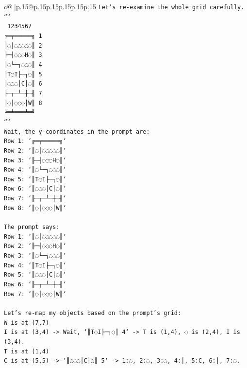 \documentclass{article}
\begin{document}
{\begin{supertabular}{c@{$\;$}|p{.15\linewidth}@{}p{.15\linewidth}p{.15\linewidth}p{.15\linewidth}p{.15\linewidth}p{.15\linewidth}}
{{{\texttt{Let's re{-}examine the whole grid carefully.} \\
\texttt{```} \\
\texttt{ 1234567} \\
\texttt{╔═╤═════╗ 1} \\
\texttt{║◌│◌◌◌◌◌║ 2} \\
\texttt{╟─┤◌◌◌H◌║ 3} \\
\texttt{║◌└─┐◌◌◌║ 4} \\
\texttt{║T◌I├─┐◌║ 5} \\
\texttt{║◌◌◌│C│◌║ 6} \\
\texttt{╟─┬─┴─┼─╢ 7} \\
\texttt{║◌│◌◌◌│W║ 8} \\
\texttt{╚═╧═══╧═╝} \\
\texttt{```} \\
\texttt{Wait, the y{-}coordinates in the prompt are:} \\
\texttt{Row 1: `╔═╤═════╗`} \\
\texttt{Row 2: `║◌│◌◌◌◌◌║`} \\
\texttt{Row 3: `╟─┤◌◌◌H◌║`} \\
\texttt{Row 4: `║◌└─┐◌◌◌║`} \\
\texttt{Row 5: `║T◌I├─┐◌║`} \\
\texttt{Row 6: `║◌◌◌│C│◌║`} \\
\texttt{Row 7: `╟─┬─┴─┼─╢`} \\
\texttt{Row 8: `║◌│◌◌◌│W║`} \\
\\ 
\texttt{The prompt says:} \\
\texttt{Row 1: `║◌│◌◌◌◌◌║`} \\
\texttt{Row 2: `╟─┤◌◌◌H◌║`} \\
\texttt{Row 3: `║◌└─┐◌◌◌║`} \\
\texttt{Row 4: `║T◌I├─┐◌║`} \\
\texttt{Row 5: `║◌◌◌│C│◌║`} \\
\texttt{Row 6: `╟─┬─┴─┼─╢`} \\
\texttt{Row 7: `║◌│◌◌◌│W║`} \\
\\ 
\texttt{Let's re{-}map my objects based on the prompt's grid:} \\
\texttt{W is at (7,7)} \\
\texttt{I is at (3,4) {-}> Wait, `║T◌I├─┐◌║ 4` {-}> T is (1,4), ◌ is (2,4), I is (3,4).} \\
\texttt{T is at (1,4)} \\
\texttt{C is at (5,5) {-}> `║◌◌◌│C│◌║ 5` {-}> 1:◌, 2:◌, 3:◌, 4:│, 5:C, 6:│, 7:◌.} \\
}}}
\end{supertabular}}
\end{document}
